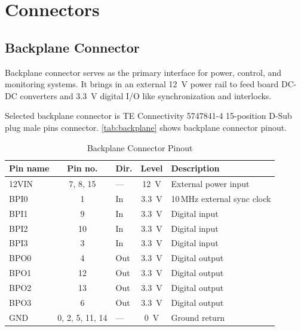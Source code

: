 \section{Connectors}

\subsection{Backplane Connector}

Backplane connector serves as the primary interface for power, control, and monitoring systems. It brings in an external \SI{12}{\volt} power rail to feed board DC-DC converters and \SI{3.3}{\volt} digital I/O like synchronization and interlocks. 

Selected backplane connector is TE Connectivity 5747841-4 15-position D-Sub plug male pins connector. \autoref{tab:backplane} shows backplane connector pinout.

\begin{table}[ht]
  \centering
  \begin{tabular}{l c l c l}
    \toprule
    Pin name  & Pin no.     & Dir. & Level            & Description                                \\
    \midrule
    12VIN     & 7, 8, 15        & —    & \SI{12}{\volt}   & External power input                       \\[3pt]
    BPI0      & 1               & In   & \SI{3.3}{\volt}  & 10\,\si{\mega\hertz} external sync clock  \\
    BPI1      & 9               & In   & \SI{3.3}{\volt}  & Digital input                              \\
    BPI2      & 10              & In   & \SI{3.3}{\volt}  & Digital input                              \\
    BPI3      & 3               & In   & \SI{3.3}{\volt}  & Digital input                              \\[3pt]
    BPO0      & 4               & Out  & \SI{3.3}{\volt}  & Digital output                             \\
    BPO1      & 12              & Out  & \SI{3.3}{\volt}  & Digital output                             \\
    BPO2      & 13              & Out  & \SI{3.3}{\volt}  & Digital output                             \\
    BPO3      & 6               & Out  & \SI{3.3}{\volt}  & Digital output                             \\[3pt]
    GND       & 0, 2, 5, 11, 14 & —    & \SI{0}{\volt}    & Ground return                              \\
    \bottomrule
  \end{tabular}
  \caption{Backplane Connector Pinout}
  \label{tab:backplane}
\end{table}

